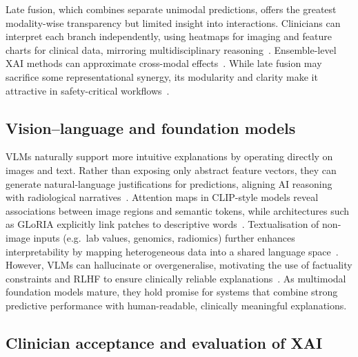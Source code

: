 Late fusion, which combines separate unimodal predictions, offers the greatest modality-wise transparency but limited insight into interactions. Clinicians can interpret each branch independently, using heatmaps for imaging and feature charts for clinical data, mirroring multidisciplinary reasoning~\cite{abgrall2024should}. Ensemble-level XAI methods can approximate cross-modal effects~\cite{sharma2025xai}. While late fusion may sacrifice some representational synergy, its modularity and clarity make it attractive in safety-critical workflows~\cite{abgrall2024should}.

\subsection{Vision–language and foundation models}

VLMs naturally support more intuitive explanations by operating directly on images and text. Rather than exposing only abstract feature vectors, they can generate natural-language justifications for predictions, aligning AI reasoning with radiological narratives~\cite{sharma2025xai,pahud2024orchestrating}. Attention maps in CLIP-style models reveal associations between image regions and semantic tokens, while architectures such as GLoRIA explicitly link patches to descriptive words~\cite{napravnik2025lessons,huang2021gloria}. Textualisation of non-image inputs (e.g.\ lab values, genomics, radiomics) further enhances interpretability by mapping heterogeneous data into a shared language space~\cite{sharma2025xai}. However, VLMs can hallucinate or overgeneralise, motivating the use of factuality constraints and RLHF to ensure clinically reliable explanations~\cite{pahud2024orchestrating}. As multimodal foundation models mature, they hold promise for systems that combine strong predictive performance with human-readable, clinically meaningful explanations.

\subsection{Clinician acceptance and evaluation of XAI}

